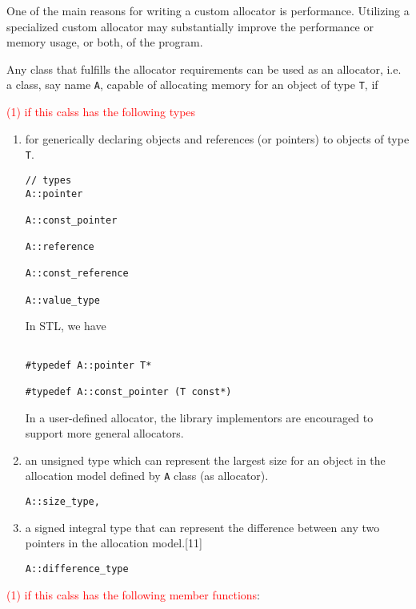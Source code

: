 One of the main reasons for writing a custom allocator is performance. Utilizing
a specialized custom allocator may substantially improve the performance or
memory usage, or both, of the program.  

Any class that fulfills the allocator requirements can be used as an allocator,
i.e. a class, say name \verb!A!, capable of allocating memory for an object of
type \verb!T!, if

\textcolor{red}{(1) if this calss has the following types}
\begin{enumerate}
  \item for generically declaring objects and references (or pointers) to objects of type \verb!T!.

\begin{verbatim}
// types
A::pointer

A::const_pointer

A::reference

A::const_reference

A::value_type

\end{verbatim}

In STL, we have
\begin{verbatim}

#typedef A::pointer T*

#typedef A::const_pointer (T const*)
\end{verbatim}

In a user-defined allocator, the library implementors are encouraged to support more general allocators.

  
  \item an unsigned type which can represent the largest size for an object in the allocation model defined by \verb!A! class (as allocator).
  
\begin{verbatim}
A::size_type,
\end{verbatim}

   \item a signed integral type that can represent the difference between any two pointers in the allocation model.[11]
   
   
\begin{verbatim}
A::difference_type 
\end{verbatim}
\end{enumerate}


\textcolor{red}{(1) if this calss has the following member functions}: 

